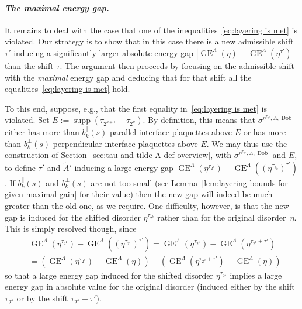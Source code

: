 \documentclass[11pt, reqno]{amsart}
\DeclareMathOperator{\supp}{supp}
\DeclareMathOperator{\Dob}{Dob}
\DeclareMathOperator{\GE}{GE}
\numberwithin{equation}{section}
\begin{document}
\smallskip
\paragraph{\emph{The maximal energy gap.}}\label{sec:maximal energy gap overview} It remains to deal with the case that one of the inequalities~\eqref{eq:layering is met} is violated. Our strategy is to show that in this case there is a new admissible shift $\tau'$ inducing a significantly larger absolute energy gap $|\GE^\Lambda(\eta) - \GE^\Lambda(\eta^{\tau'})|$ than the shift $\tau$. The argument then proceeds by focusing on the admissible shift with the \emph{maximal} energy gap and deducing that for that shift all the equalities~\eqref{eq:layering is met} hold.

To this end, suppose, e.g., that the first equality in~\eqref{eq:layering is met} is violated. Set $E := \supp(\tau_{2^{k+1}}-\tau_{2^k})$. By definition, this means that $\sigma^{\eta^{\tau_{2^k}},\Lambda,\Dob}$ either has more than $b_k^\parallel(s)$ parallel interface plaquettes above $E$ or has more than $b_k^\perp(s)$ perpendicular interface plaquettes above $E$. We may thus use the construction of Section~\ref{sec:tau and tilde A def overview}, with $\sigma^{\eta^{\tau_{2^k}},\Lambda,\Dob}$ and $E$, to define $\tau'$ and $\tilde{A}'$ inducing a large energy gap $\GE^\Lambda(\eta^{\tau_{2^k}}) - \GE^\Lambda((\eta^{\tau_{2_k}})^{\tau'})$. If $b_k^\parallel(s)$ and $b_k^\perp(s)$ are not too small (see Lemma~\ref{lem:layering bounds for given maximal gain} for their value) then the new gap will indeed be much greater than the old one, as we require. One difficulty, however, is that the new gap is induced for the shifted disorder $\eta^{\tau_{2^k}}$ rather than for the original disorder~$\eta$. This is simply resolved though, since
\begin{equation}\label{eq:new shift from old}
\begin{split}
&\GE^\Lambda(\eta^{\tau_{2^k}}) - \GE^\Lambda((\eta^{\tau_{2^k}})^{\tau'}) = \GE^\Lambda(\eta^{\tau_{2^k}}) - \GE^\Lambda(\eta^{\tau_{2^k}+\tau'})\\
&= \left(\GE^\Lambda(\eta^{\tau_{2^k}}) - \GE^\Lambda(\eta)\right) - \left(\GE^\Lambda(\eta^{\tau_{2^k}+\tau'}) - \GE^\Lambda(\eta)\right)
\end{split}
\end{equation}
so that a large energy gap induced for the shifted disorder $\eta^{\tau_{2^k}}$ implies a large energy gap in absolute value for the original disorder (induced either by the shift $\tau_{2^k}$ or by the shift $\tau_{2^k}+\tau'$).
\end{document}
